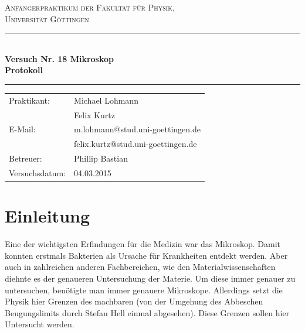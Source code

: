 \documentclass[12pt,a4paper,titlepage,headinclude,bibtotoc]{scrartcl}
\begin{document}
\begin{titlepage}
\centering
\textsc{\Large Anfängerpraktikum der Fakultät für
  Physik,\\[1.5ex] Universität Göttingen}

\vspace*{3cm}

\rule{\textwidth}{1pt}\\[0.5cm]
{\huge \bfseries
  Versuch Nr. 18 Mikroskop \\[1.5ex]
  Protokoll}\\[0.5cm]
\rule{\textwidth}{1pt}

\vspace*{3cm}

\begin{Large}
\begin{tabular}{ll}
Praktikant: &  Michael Lohmann\\
 &  Felix Kurtz\\
 E-Mail: & m.lohmann@stud.uni-goettingen.de\\
 &  felix.kurtz@stud.uni-goettingen.de\\
 Betreuer: & Phillip Bastian\\
 Versuchsdatum: & 04.03.2015\\
\end{tabular}
\end{Large}

\vspace*{0.8cm}

\begin{Large}
\end{Large}

\end{titlepage}

\tableofcontents

\newpage

\section{Einleitung}
\label{sec:einleitung}
Eine der wichtigsten Erfindungen für die Medizin war das Mikroskop.
Damit konnten erstmals Bakterien als Ursache für Krankheiten entdekt werden.
Aber auch in zahlreichen anderen Fachbereichen, wie den Materialwissenschaften diehnte es der genaueren Untersuchung der Materie.
Um diese immer genauer zu untersuchen, benötigte man immer genauere Mikroskope.
Allerdings setzt die Physik hier Grenzen des machbaren (von der Umgehung des Abbeschen Beugungslimits durch Stefan Hell einmal abgesehen).
Diese Grenzen sollen hier Untersucht werden.
\end{document}

